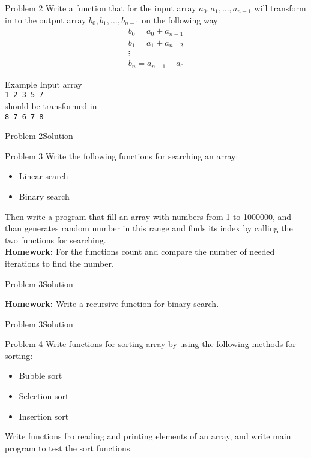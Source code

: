 \begin{frame}{Problem 2}
Write a function that for the input array $a_0, a_1, \ldots, a_{n-1}$ will
transform in to the output array $b_0, b_1,
\ldots, b_{n-1}$ on the following way
\[
\begin{array}{l}
b_0 = a_0 + a_{n-1}\\
b_1 = a_1 + a_{n-2}\\
\vdots\\
b_n = a_{n-1} + a_{0}
\end{array}
\]
\begin{exampleblock}{Example} 
Input array\\
\texttt{1 2 3 5 7}\\
should be transformed in\\
\texttt{8 7 6 7 8}
\end{exampleblock}
\end{frame}

\begin{frame}[fragile]{Problem 2}{Solution} 

\end{frame}

\begin{frame}{Problem 3}
Write the following functions for searching an array:
\begin{itemize}
  \item Linear search
  \item Binary search
\end{itemize}  
Then write a program that fill an array with numbers from 1 to 1000000,
and than generates random number in this range and finds its index by calling
the two functions for searching.\\
\textbf{Homework:} For the functions count and compare the number of needed
iterations to find the number.
\end{frame}


\begin{frame}[fragile]{Problem 3}{Solution}

\textbf{Homework:} Write a recursive function for binary search.
\end{frame}

\begin{frame}[fragile]{Problem 3}{Solution}

\end{frame}


\begin{frame}{Problem 4}
Write functions for sorting array by using the following methods for sorting:
\begin{itemize}
  \item Bubble sort
  \item Selection sort
  \item Insertion sort
\end{itemize}
Write functions fro reading and printing elements of an array, and write main
program to test the sort functions.
\end{frame}

